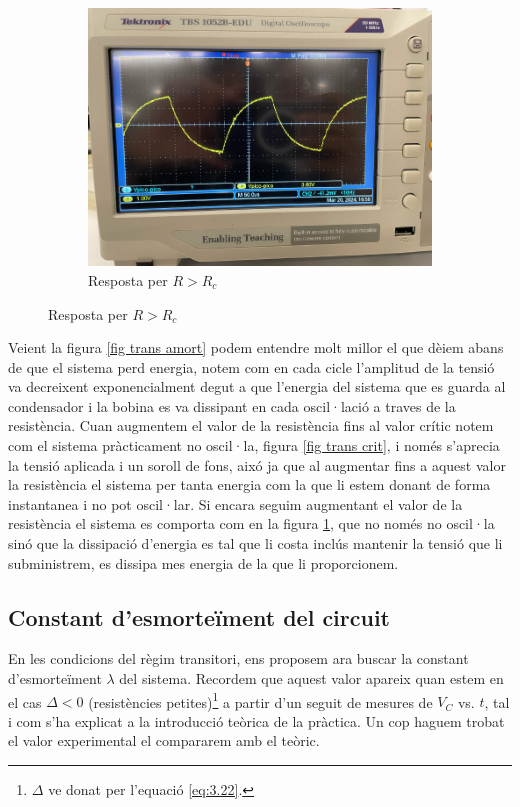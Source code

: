 \documentclass[a4paper,10.5pt]{report}
\begin{document}
\begin{figure}[H]
\begin{subfigure}{0.32\linewidth}
		\includegraphics[width=\linewidth]{trans sobre.PNG}
		\caption{Resposta per $R>R_c$}
		\label{fig trans sobre}
	\end{subfigure}
	\label{fig trans}
\end{figure}

Veient la figura \ref{fig trans amort} podem entendre molt millor el que dèiem abans de que el sistema perd energia, notem com en cada cicle l'amplitud de la tensió va decreixent exponencialment degut a que l'energia del sistema que es guarda al condensador i la bobina es va dissipant en cada oscil·lació a traves de la resistència. Cuan augmentem el valor de la resistència fins al valor crític notem com el sistema pràcticament no oscil·la, figura \ref{fig trans crit}, i només s'aprecia la tensió aplicada i un soroll de fons, aixó ja que al augmentar fins a aquest valor la resistència el sistema per tanta energia com la que li estem donant de forma instantanea i no pot oscil·lar. Si encara seguim augmentant el valor de la resistència el sistema es comporta com en la figura \ref{fig trans sobre}, que no només no oscil·la sinó que la dissipació d'energia es tal que li costa inclús mantenir la tensió que li subministrem, es dissipa mes energia de la que li proporcionem.

\subsection{Constant d'esmorteïment del circuit}
En les condicions del règim transitori, ens proposem ara buscar la constant d'esmorteïment $\lambda$ del sistema. Recordem que aquest valor apareix quan estem en el cas $\Delta < 0$ (resistències petites)\footnote{$\Delta$ ve donat per l'equació \eqref{eq:3.22}.} a partir d'un seguit de mesures de $V_C$ vs. $t$, tal i com s'ha explicat a la introducció teòrica de la pràctica. Un cop haguem trobat el valor experimental el compararem amb el teòric.
\end{document}
